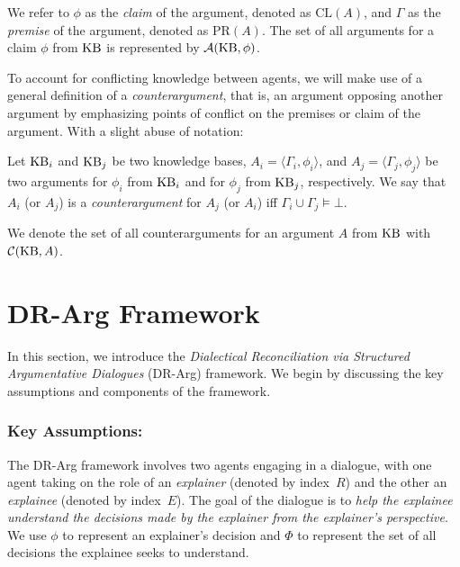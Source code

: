 \documentclass{article}
\begin{document}
\noindent We refer to $\phi$ as the \emph{claim} of the argument, denoted as $\mathrm{CL}(A)$, and $\Gamma$ as the \emph{premise} of the argument, denoted as $\mathrm{PR}(A)$. The set of all arguments for a claim $\phi$ from $\mathrm{KB}$ is represented by $\mathcal{A}(\mathrm{KB}, \phi)$.



To account for conflicting knowledge between agents, we will make use of a general definition of a \emph{counterargument}, that is, an argument opposing another argument by emphasizing points of conflict on the premises or claim of the argument. With a slight abuse of notation:

\begin{definition}[Counterargument]
   Let $\mathrm{KB}_i$ and $\mathrm{KB}_j$ be two knowledge bases, 
   $A_i = \langle \Gamma_i, \phi_i \rangle$, and $A_j = \langle \Gamma_j, \phi_j \rangle$ be two arguments for $\phi_i$ from $\mathrm{KB}_i$ and for $\phi_j$ from $\mathrm{KB}_j$, respectively. We say that $A_i$ (or $A_j$) is a \emph{counterargument} for $A_j$ (or $A_i$) iff $\Gamma_i \cup \Gamma_j \models \bot$.
\end{definition}


\noindent We denote the set of all counterarguments for an argument $A$ from $\mathrm{KB}$ with $\mathcal{C}(\mathrm{KB}, A)$.





\section{DR-Arg Framework}
\label{drai-frame}


In this section, we introduce the \textit{Dialectical Reconciliation via Structured Argumentative Dialogues} (DR-Arg) framework. We begin by discussing the key assumptions and components of the framework. 


\subsubsection{Key Assumptions:}

The DR-Arg framework involves two agents engaging in a dialogue, with one agent taking on the role of an \textit{explainer} (denoted by index~$R$) and the other an \textit{explainee} (denoted by index~$E$). The goal of the dialogue is to \textit{help the explainee understand the decisions made by the explainer from the explainer's perspective}. We use $\phi$ to represent an explainer's decision and $\Phi$ to represent the set of all decisions the explainee seeks to understand. 
\end{document}
